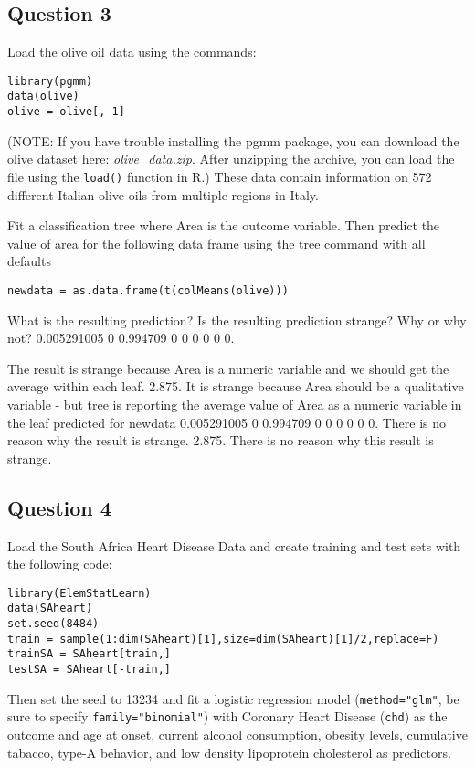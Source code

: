 \subsection*{Question 3}
Load the olive oil data using the commands:

\begin{framed}
\begin{verbatim}
library(pgmm)
data(olive)
olive = olive[,-1]
\end{verbatim}
\end{framed}
(NOTE: If you have trouble installing the pgmm package, you can download the olive dataset here: \textit{olive\_data.zip}. After unzipping the archive, you can load the file using the \texttt{load()} function in R.)
These data contain information on 572 different Italian olive oils from multiple regions in Italy. 

Fit a classification tree where Area is the outcome variable. Then predict the value of area for the following data frame using the tree command with all defaults

\begin{framed}
	\begin{verbatim}
newdata = as.data.frame(t(colMeans(olive)))
\end{verbatim}
\end{framed} 
What is the resulting prediction? Is the resulting prediction strange? Why or why not?
0.005291005 0 0.994709 0 0 0 0 0 0. 

The result is strange because Area is a numeric variable and we should get the average within each leaf.
2.875. It is strange because Area should be a qualitative variable - but tree is reporting the average value of Area as a numeric variable in the leaf predicted for newdata
0.005291005 0 0.994709 0 0 0 0 0 0. 
There is no reason why the result is strange.
2.875. There is no reason why this result is strange.
\subsection*{Question 4}
Load the South Africa Heart Disease Data and create training and test sets with the following code:
\begin{framed}
\begin{verbatim}
library(ElemStatLearn)
data(SAheart)
set.seed(8484)
train = sample(1:dim(SAheart)[1],size=dim(SAheart)[1]/2,replace=F)
trainSA = SAheart[train,]
testSA = SAheart[-train,]
\end{verbatim}
\end{framed} 
Then set the seed to 13234 and fit a logistic regression model (\texttt{method="glm"}, be sure to specify \texttt{family="binomial"}) with Coronary Heart Disease (\texttt{chd}) as the outcome and age at onset, current alcohol consumption, obesity levels, cumulative tabacco, type-A behavior, and low density lipoprotein cholesterol as predictors. 

